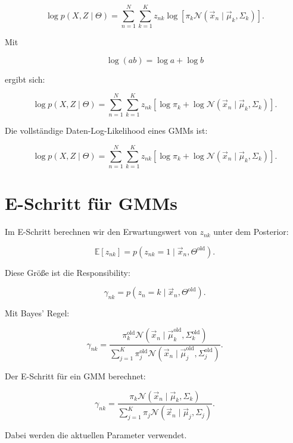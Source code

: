 \[
    \log p(X,Z\mid\Theta)
    =
    \sum_{n=1}^{N}
    \sum_{k=1}^{K}
    z_{nk}
    \log
    \left[
        \pi_k
        \mathcal{N}(\vec{x}_n\mid\vec{\mu}_k,\Sigma_k)
    \right].
\]

Mit

\[
    \log(ab)=\log a+\log b
\]

ergibt sich:

\[
    \log p(X,Z\mid\Theta)
    =
    \sum_{n=1}^{N}
    \sum_{k=1}^{K}
    z_{nk}
    \left[
        \log \pi_k
        +
        \log
        \mathcal{N}(\vec{x}_n\mid\vec{\mu}_k,\Sigma_k)
    \right].
\]

\begin{definitionbox}
Die vollständige Daten-Log-Likelihood eines GMMs ist:

\[
    \log p(X,Z\mid\Theta)
    =
    \sum_{n=1}^{N}
    \sum_{k=1}^{K}
    z_{nk}
    \left[
        \log \pi_k
        +
        \log
        \mathcal{N}(\vec{x}_n\mid\vec{\mu}_k,\Sigma_k)
    \right].
\]
\end{definitionbox}

\section{E-Schritt für GMMs}

Im E-Schritt berechnen wir den Erwartungswert von \(z_{nk}\) unter dem Posterior:

\[
    \mathbb{E}[z_{nk}]
    =
    p(z_{nk}=1\mid\vec{x}_n,\Theta^{\mathrm{old}}).
\]

Diese Größe ist die Responsibility:

\[
    \gamma_{nk}
    =
    p(z_n=k\mid\vec{x}_n,\Theta^{\mathrm{old}}).
\]

Mit Bayes' Regel:

\[
    \gamma_{nk}
    =
    \frac{
        \pi_k^{\mathrm{old}}
        \mathcal{N}(\vec{x}_n\mid\vec{\mu}_k^{\mathrm{old}},\Sigma_k^{\mathrm{old}})
    }{
        \sum_{j=1}^{K}
        \pi_j^{\mathrm{old}}
        \mathcal{N}(\vec{x}_n\mid\vec{\mu}_j^{\mathrm{old}},\Sigma_j^{\mathrm{old}})
    }.
\]

\begin{definitionbox}
Der E-Schritt für ein GMM berechnet:

\[
    \gamma_{nk}
    =
    \frac{
        \pi_k
        \mathcal{N}(\vec{x}_n\mid\vec{\mu}_k,\Sigma_k)
    }{
        \sum_{j=1}^{K}
        \pi_j
        \mathcal{N}(\vec{x}_n\mid\vec{\mu}_j,\Sigma_j)
    }.
\]

Dabei werden die aktuellen Parameter verwendet.
\end{definitionbox}

